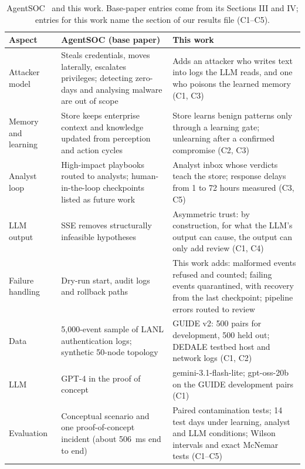 \documentclass[conference]{IEEEtran}
\begin{document}
\begin{table}[t]
\caption{AgentSOC~\cite{agentsoc} and this work. Base-paper entries come from its Sections III and IV; entries for
this work name the section of our results file (C1--C5).}
\label{tab:compare}
\centering\footnotesize
\begin{tabular}{@{}>{\raggedright}p{2.6cm}>{\raggedright}p{6.4cm}>{\raggedright\arraybackslash}p{7.6cm}@{}}
\toprule
Aspect & AgentSOC (base paper) & This work \\
\midrule
Attacker model & Steals credentials, moves laterally, escalates privileges; detecting zero-days and analysing
malware are out of scope & Adds an attacker who writes text into logs the LLM reads, and one who poisons the learned
memory (C1, C3) \\
Memory and learning & Store keeps enterprise context and knowledge updated from perception and action cycles &
Store learns benign patterns only through a learning gate; unlearning after a confirmed compromise (C2, C3) \\
Analyst loop & High-impact playbooks routed to analysts; human-in-the-loop checkpoints listed as future work &
Analyst inbox whose verdicts teach the store; response delays from 1 to 72 hours measured (C3, C5) \\
LLM output & SSE removes structurally infeasible hypotheses & Asymmetric trust: by construction, for what the LLM's
output can cause, the output can only add review (C1, C4) \\
Failure handling & Dry-run start, audit logs and rollback paths & This work adds: malformed events refused and
counted; failing events quarantined, with recovery from the last checkpoint; pipeline errors routed to review \\
Data & 5,000-event sample of LANL authentication logs; synthetic 50-node topology & GUIDE v2: 500 pairs for
development, 500 held out; DEDALE testbed host and network logs (C1, C2) \\
LLM & GPT-4 in the proof of concept & gemini-3.1-flash-lite; gpt-oss-20b on the GUIDE development pairs (C1) \\
Evaluation & Conceptual scenario and one proof-of-concept incident (about 506~ms end to end) & Paired contamination
tests; 14 test days under learning, analyst and LLM conditions; Wilson intervals and exact McNemar tests
(C1--C5) \\
\bottomrule
\end{tabular}
\end{table}
\end{document}
